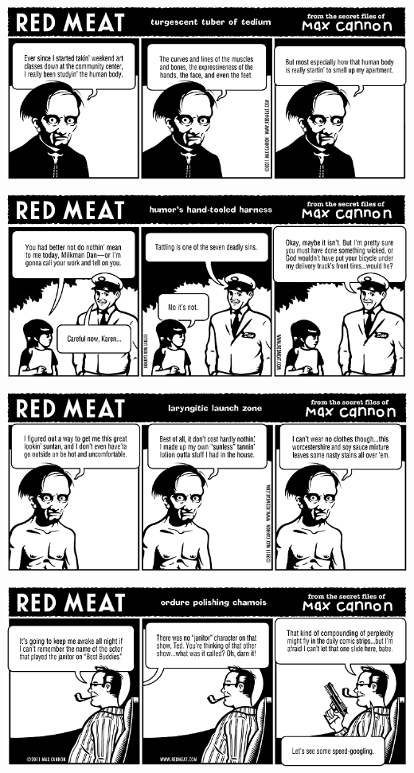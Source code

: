 \documentclass[a4paper,twoside,11pt]{article}
\begin{document}
\includegraphics[width=\textwidth]{redmeat_2011-05-03.png}



\includegraphics[width=\textwidth]{redmeat_2011-05-10.png}



\includegraphics[width=\textwidth]{redmeat_2011-05-17.png}



\includegraphics[width=\textwidth]{redmeat_2011-05-24.png}
\end{document}
